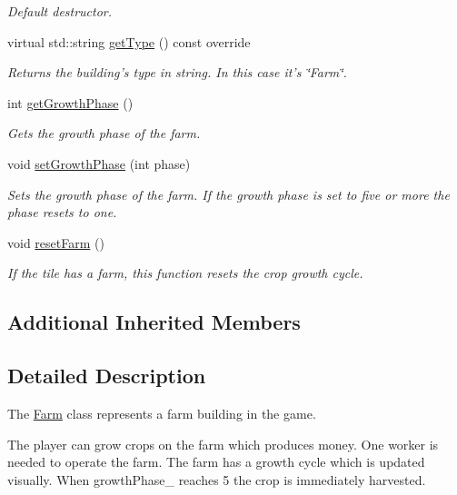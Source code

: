\begin{DoxyCompactItemize}
\begin{DoxyCompactList}\small\item\em Default destructor. \end{DoxyCompactList}\item 
virtual std\-::string \hyperlink{class_course_1_1_farm_a54ade72809a36d31e0e426eb79d6251a}{get\-Type} () const override
\begin{DoxyCompactList}\small\item\em Returns the building's type in string. In this case it's \char`\"{}\-Farm\char`\"{}. \end{DoxyCompactList}\item 
int \hyperlink{class_course_1_1_farm_a565721fca3c0343d991675ae70e1de1a}{get\-Growth\-Phase} ()
\begin{DoxyCompactList}\small\item\em Gets the growth phase of the farm. \end{DoxyCompactList}\item 
void \hyperlink{class_course_1_1_farm_a8c60ea7d4e2761468b4b0ebba7a6bb3a}{set\-Growth\-Phase} (int phase)
\begin{DoxyCompactList}\small\item\em Sets the growth phase of the farm. If the growth phase is set to five or more the phase resets to one. \end{DoxyCompactList}\item 
void \hyperlink{class_course_1_1_farm_af231394911670b60f64a8e89662207c1}{reset\-Farm} ()
\begin{DoxyCompactList}\small\item\em If the tile has a farm, this function resets the crop growth cycle. \end{DoxyCompactList}\end{DoxyCompactItemize}
\subsection*{Additional Inherited Members}


\subsection{Detailed Description}
The \hyperlink{class_course_1_1_farm}{Farm} class represents a farm building in the game. 

The player can grow crops on the farm which produces money. One worker is needed to operate the farm. The farm has a growth cycle which is updated visually. When growth\-Phase\-\_\- reaches 5 the crop is immediately harvested. 

